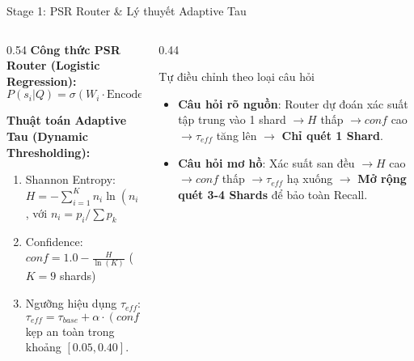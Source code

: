 \documentclass[aspectratio=169,10pt]{beamer}
\begin{document}
\begin{frame}{Stage 1: PSR Router \& Lý thuyết Adaptive Tau}
\small
\begin{columns}[T]
\begin{column}{0.54\textwidth}
\textbf{Công thức PSR Router (Logistic Regression):}
$$\boxed{P(s_i | Q) = \sigma(W_i \cdot \text{Encoder}(Q) + b_i)}$$

\textbf{Thuật toán Adaptive Tau (Dynamic Thresholding):}
\begin{enumerate}
    \item Shannon Entropy: $H = -\sum_{i=1}^K n_i \ln(n_i + 1e^{-10})$, với $n_i = p_i / \sum p_k$
    \item Confidence: $conf = 1.0 - \frac{H}{\ln(K)}$ \quad ($K=9$ shards)
    \item Ngưỡng hiệu dụng $\tau_{eff}$:
    $$\boxed{\tau_{eff} = \tau_{base} + \alpha \cdot (conf - 0.5)}$$
    kẹp an toàn trong khoảng $[0.05, 0.40]$.
\end{enumerate}
\end{column}

\begin{column}{0.44\textwidth}
\begin{exampleblock}{Tự điều chỉnh theo loại câu hỏi}
\begin{itemize}
    \item \textbf{Câu hỏi rõ nguồn}: Router dự đoán xác suất tập trung vào 1 shard $\rightarrow H$ thấp $\rightarrow conf$ cao $\rightarrow \tau_{eff}$ tăng lên $\rightarrow$ \textbf{Chỉ quét 1 Shard}.
    \item \textbf{Câu hỏi mơ hồ}: Xác suất san đều $\rightarrow H$ cao $\rightarrow conf$ thấp $\rightarrow \tau_{eff}$ hạ xuống $\rightarrow$ \textbf{Mở rộng quét 3-4 Shards} để bảo toàn Recall.
\end{itemize}
\end{exampleblock}
\end{column}
\end{columns}
\end{frame}
\end{document}
